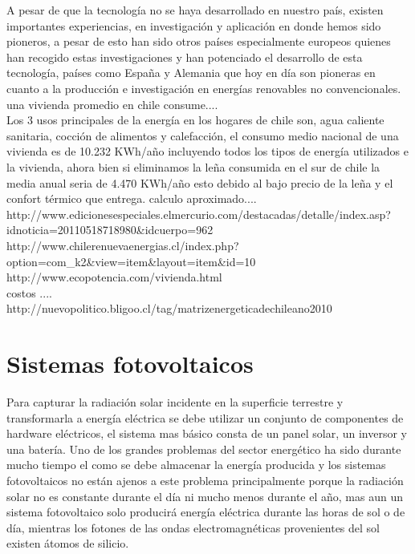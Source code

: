 A pesar de que la tecnología no se haya desarrollado en nuestro país, existen importantes experiencias, en investigación y aplicación en donde hemos sido pioneros, a pesar de esto han sido otros países especialmente europeos quienes han recogido estas investigaciones y han potenciado el desarrollo de esta tecnología, países como España y Alemania que hoy en día son pioneras en cuanto a la producción e investigación en energías renovables no convencionales.\\

una vivienda promedio en chile consume....\\

Los 3 usos principales de la energía en los hogares de chile son, agua caliente sanitaria, cocción de alimentos y calefacción, el consumo medio nacional de una vivienda es de 10.232 KWh/año incluyendo todos los tipos de energía utilizados e la vivienda, ahora bien si eliminamos la leña consumida en el sur de chile la media anual seria de 4.470 KWh/año esto debido al bajo precio de la leña y el confort térmico que entrega.
calculo aproximado....\\

http://www.edicionesespeciales.elmercurio.com/destacadas/detalle/index.asp?idnoticia=20110518718980\&idcuerpo=962\\
http://www.chilerenuevaenergias.cl/index.php?option=com\_k2\&view=item\&layout=item\&id=10\\
http://www.ecopotencia.com/vivienda.html\\

costos ....\\
http://nuevopolitico.bligoo.cl/tag/matrizenergeticadechileano2010\\

\section{Sistemas fotovoltaicos}
Para capturar la radiación solar incidente en la superficie terrestre y transformarla a energía eléctrica se debe utilizar un conjunto de componentes de hardware eléctricos, el sistema mas básico consta de un panel solar, un inversor y una batería. Uno de los grandes problemas del sector energético ha sido durante mucho tiempo el como se debe almacenar la energía producida y los sistemas fotovoltaicos no están ajenos a este problema principalmente porque la radiación solar no es constante durante el día ni mucho menos durante el año, mas aun un sistema fotovoltaico solo producirá energía eléctrica durante las horas de sol o de día, mientras los fotones de las ondas electromagnéticas provenientes del sol existen átomos de silicio.

